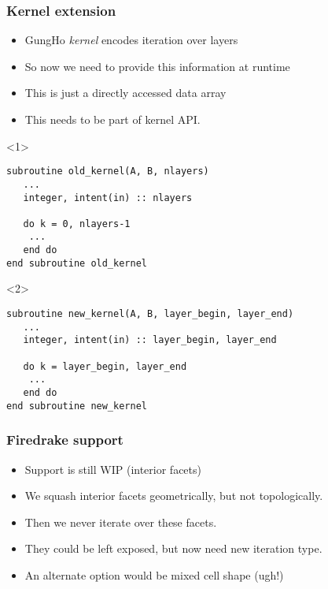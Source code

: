\documentclass[presentation]{beamer}
\begin{document}
\begin{frame}[fragile]
  \frametitle{Kernel extension}
  \begin{itemize}
  \item GungHo \emph{kernel} encodes iteration over layers
  \item So now we need to provide this information at runtime
  \item This is just a directly accessed data array
  \item This needs to be part of kernel API.
  \end{itemize}
  \begin{overlayarea}{\textwidth}{0.5\textheight}
    \begin{onlyenv}<1>
\begin{verbatim}
subroutine old_kernel(A, B, nlayers)
   ...
   integer, intent(in) :: nlayers

   do k = 0, nlayers-1
    ...
   end do
end subroutine old_kernel
\end{verbatim}
    \end{onlyenv}    
    \begin{onlyenv}<2>
\begin{verbatim}
subroutine new_kernel(A, B, layer_begin, layer_end)
   ...
   integer, intent(in) :: layer_begin, layer_end

   do k = layer_begin, layer_end
    ...
   end do
end subroutine new_kernel
\end{verbatim}
    \end{onlyenv}
  \end{overlayarea}
\end{frame}
\begin{frame}
  \frametitle{Firedrake support}
  \begin{itemize}
  \item Support is still WIP (interior facets)
  \item We squash interior facets geometrically, but not
    topologically.
  \item Then we never iterate over these facets.
  \item They could be left exposed, but now need new iteration type.
  \item An alternate option would be mixed cell shape (ugh!)
  \end{itemize}
\end{frame}
\end{document}
